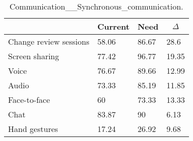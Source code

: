 
  \begin{table*}[]
  \centering
  \notsotiny
  \caption{ Communication__Synchronous_communication.}
\label{tab:communication__synchronous_communication}
\begin{tabular}{|l|l|l|l|}
  \hline
  \rowcolor[HTML]{C0C0C0}
    \multicolumn{1}{|c|}{Feature} & \multicolumn{1}{c|}{Current} & \multicolumn{1}{c|}{Need} & \multicolumn{1}{c|}{$\Delta$} \\ \hline
  Change review sessions & 58.06 & 86.67 & 28.6 \\ \hline 
Screen sharing & 77.42 & 96.77 & 19.35 \\ \hline 
Voice & 76.67 & 89.66 & 12.99 \\ \hline 
Audio & 73.33 & 85.19 & 11.85 \\ \hline 
Face-to-face & 60 & 73.33 & 13.33 \\ \hline 
Chat & 83.87 & 90 & 6.13 \\ \hline 
Hand gestures & 17.24 & 26.92 & 9.68 \\ \hline 
\end{tabular}%
  \end{table*}